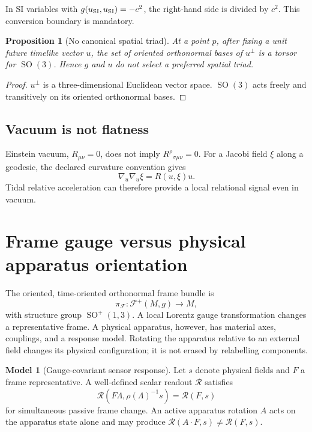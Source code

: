\documentclass[11pt,a4paper]{article}
\theoremstyle{definition}
\newtheorem{model}[definition]{Model}
\theoremstyle{plain}
\newtheorem{proposition}[definition]{Proposition}
\theoremstyle{remark}
\newcommand{\F}{\mathcal{F}}
\newcommand{\SO}{\operatorname{SO}}
\begin{document}
In SI variables with $g(u_{\rm SI},u_{\rm SI})=-c^2$, the right-hand side
is divided by $c^2$. This conversion boundary is mandatory.

\begin{proposition}[No canonical spatial triad]
At a point $p$, after fixing a unit future timelike vector $u$, the set of
oriented orthonormal bases of $u^\perp$ is a torsor for $\SO(3)$. Hence
$g$ and $u$ do not select a preferred spatial triad.
\end{proposition}
\begin{proof}
$u^\perp$ is a three-dimensional Euclidean vector space. $\SO(3)$ acts
freely and transitively on its oriented orthonormal bases.
\end{proof}

\subsection{Vacuum is not flatness}

Einstein vacuum, $R_{\mu\nu}=0$, does not imply
$R^\rho{}_{\sigma\mu\nu}=0$. For a Jacobi field $\xi$ along a geodesic,
the declared curvature convention gives
\[
\nabla_u\nabla_u\xi=R(u,\xi)u.
\]
Tidal relative acceleration can therefore provide a local relational
signal even in vacuum.

\section{Frame gauge versus physical apparatus orientation}

The oriented, time-oriented orthonormal frame bundle is
\[
\pi_{\F}:\F^+(M,g)\to M,
\]
with structure group $\SO^+(1,3)$. A local Lorentz gauge transformation
changes a representative frame. A physical apparatus, however, has
material axes, couplings, and a response model. Rotating the apparatus
relative to an external field changes its physical configuration; it is
not erased by relabelling components.

\begin{model}[Gauge-covariant sensor response]
Let $s$ denote physical fields and $F$ a frame representative. A
well-defined scalar readout $\mathcal R$ satisfies
\[
\mathcal R(F\Lambda,\rho(\Lambda)^{-1}s)
=\mathcal R(F,s)
\]
for simultaneous passive frame change. An active apparatus rotation
$A$ acts on the apparatus state alone and may produce
$\mathcal R(A\!\cdot\!F,s)\ne\mathcal R(F,s)$.
\end{model}
\end{document}
